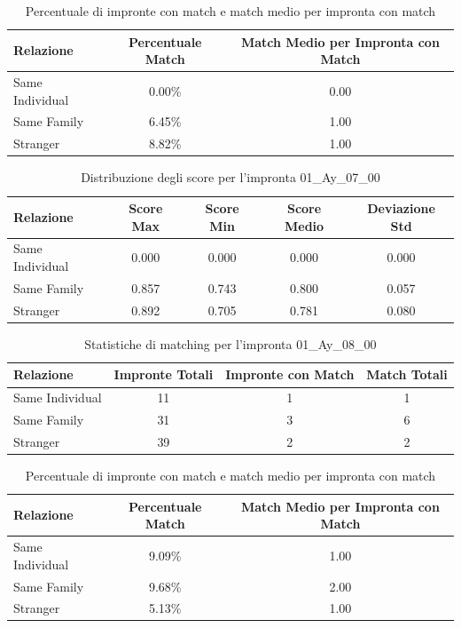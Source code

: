 \begin{table}[htbp]
\centering
\caption{Percentuale di impronte con match e match medio per impronta con match}
\label{tab:match_percentage_01_Ay_07_00}
\begin{tabular}{|l|c|c|}
\hline
\textbf{Relazione} & \textbf{Percentuale Match} & \textbf{Match Medio per Impronta con Match} \\
\hline
Same Individual & 0.00\% & 0.00 \\
\hline
Same Family & 6.45\% & 1.00 \\
\hline
Stranger & 8.82\% & 1.00 \\
\hline
\end{tabular}
\end{table}


\begin{table}[htbp]
\centering
\caption{Distribuzione degli score per l'impronta 01\_Ay\_07\_00}
\label{tab:scores_01_Ay_07_00}
\begin{tabular}{|l|c|c|c|c|}
\hline
\textbf{Relazione} & \textbf{Score Max} & \textbf{Score Min} & \textbf{Score Medio} & \textbf{Deviazione Std} \\
\hline
Same Individual & 0.000 & 0.000 & 0.000 & 0.000 \\
\hline
Same Family & 0.857 & 0.743 & 0.800 & 0.057 \\
\hline
Stranger & 0.892 & 0.705 & 0.781 & 0.080 \\
\hline
\end{tabular}
\end{table}


\begin{table}[htbp]
\centering
\caption{Statistiche di matching per l'impronta 01\_Ay\_08\_00}
\label{tab:results_01_Ay_08_00}
\begin{tabular}{|l|c|c|c|}
\hline
\textbf{Relazione} & \textbf{Impronte Totali} & \textbf{Impronte con Match} & \textbf{Match Totali} \\
\hline
Same Individual & 11 & 1 & 1 \\
\hline
Same Family & 31 & 3 & 6 \\
\hline
Stranger & 39 & 2 & 2 \\
\hline
\end{tabular}
\end{table}


\begin{table}[htbp]
\centering
\caption{Percentuale di impronte con match e match medio per impronta con match}
\label{tab:match_percentage_01_Ay_08_00}
\begin{tabular}{|l|c|c|}
\hline
\textbf{Relazione} & \textbf{Percentuale Match} & \textbf{Match Medio per Impronta con Match} \\
\hline
Same Individual & 9.09\% & 1.00 \\
\hline
Same Family & 9.68\% & 2.00 \\
\hline
Stranger & 5.13\% & 1.00 \\
\hline
\end{tabular}
\end{table}


